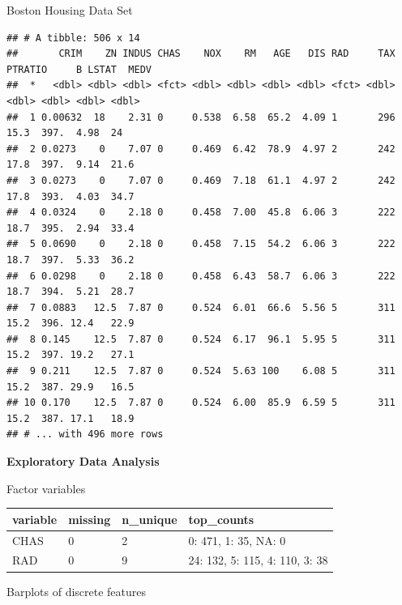 \documentclass[11pt,compress,t,notes=noshow, xcolor=table]{beamer}
\makeatletter
\newenvironment{kframe}{%
 \def\at@end@of@kframe{}%
 \ifinner\ifhmode%
  \def\at@end@of@kframe{\end{minipage}}%
  \begin{minipage}{\columnwidth}%
 \fi\fi%
 \def\FrameCommand##1{\hskip\@totalleftmargin \hskip-\fboxsep
 \colorbox{shadecolor}{##1}\hskip-\fboxsep
     \hskip-\linewidth \hskip-\@totalleftmargin \hskip\columnwidth}%
 \MakeFramed {\advance\hsize-\width
   \@totalleftmargin\z@ \linewidth\hsize
   \@setminipage}}%
 {\par\unskip\endMakeFramed%
 \at@end@of@kframe}
\newenvironment{knitrout}{}{} %
\makeatother
\begin{document}
\begin{vbframe}{Boston Housing Data Set}
\vfill
\begin{knitrout}\tiny
{}\color{fgcolor}\begin{kframe}
\begin{verbatim}
## # A tibble: 506 x 14
##       CRIM    ZN INDUS CHAS    NOX    RM   AGE   DIS RAD     TAX PTRATIO     B LSTAT  MEDV
##  *   <dbl> <dbl> <dbl> <fct> <dbl> <dbl> <dbl> <dbl> <fct> <dbl>   <dbl> <dbl> <dbl> <dbl>
##  1 0.00632  18    2.31 0     0.538  6.58  65.2  4.09 1       296    15.3  397.  4.98  24  
##  2 0.0273    0    7.07 0     0.469  6.42  78.9  4.97 2       242    17.8  397.  9.14  21.6
##  3 0.0273    0    7.07 0     0.469  7.18  61.1  4.97 2       242    17.8  393.  4.03  34.7
##  4 0.0324    0    2.18 0     0.458  7.00  45.8  6.06 3       222    18.7  395.  2.94  33.4
##  5 0.0690    0    2.18 0     0.458  7.15  54.2  6.06 3       222    18.7  397.  5.33  36.2
##  6 0.0298    0    2.18 0     0.458  6.43  58.7  6.06 3       222    18.7  394.  5.21  28.7
##  7 0.0883   12.5  7.87 0     0.524  6.01  66.6  5.56 5       311    15.2  396. 12.4   22.9
##  8 0.145    12.5  7.87 0     0.524  6.17  96.1  5.95 5       311    15.2  397. 19.2   27.1
##  9 0.211    12.5  7.87 0     0.524  5.63 100    6.08 5       311    15.2  387. 29.9   16.5
## 10 0.170    12.5  7.87 0     0.524  6.00  85.9  6.59 5       311    15.2  387. 17.1   18.9
## # ... with 496 more rows
\end{verbatim}
\end{kframe}
\end{knitrout}
\vfill

\framebreak

\textbf{Exploratory Data Analysis}


Factor variables

\begin{table}[H]
\centering\begingroup\fontsize{7}{9}\selectfont

\begin{tabular}{llll}
\toprule
variable & missing & n\_unique & top\_counts\\
\midrule
CHAS & 0 & 2 & 0: 471, 1: 35, NA: 0\\
RAD & 0 & 9 & 24: 132, 5: 115, 4: 110, 3: 38\\
\bottomrule
\end{tabular}\endgroup{}
\end{table}




Barplots of discrete features

\begin{knitrout}\tiny
{}\color{fgcolor}


\end{knitrout}
\end{vbframe}
\end{document}
